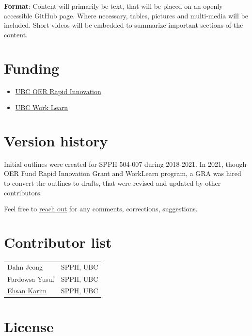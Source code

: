 \documentclass[
]{book}
\providecommand{\tightlist}{%
  \setlength{\itemsep}{0pt}\setlength{\parskip}{0pt}}
\begin{document}
\textbf{Format}: Content will primarily be text, that will be placed on an openly accessible GitHub page. Where necessary, tables, pictures and multi-media will be included. Short videos will be embedded to summarize important sections of the content.

\hypertarget{funding}{%
\section*{Funding}\label{funding}}

\begin{itemize}
\tightlist
\item
  \href{https://oerfund.open.ubc.ca/oer-rapid-innovation-grants/}{UBC OER Rapid Innovation}
\item
  \href{https://facultystaff.students.ubc.ca/student-engagement/centre-student-involvement-careers/work-learn}{UBC Work Learn}
\end{itemize}

\hypertarget{version-history}{%
\section*{Version history}\label{version-history}}

Initial outlines were created for SPPH 504-007 during 2018-2021. In 2021, though OER Fund Rapid Innovation Grant and WorkLearn program, a GRA was hired to convert the outlines to drafts, that were revised and updated by other contributors.

Feel free to \href{https://ehsank.com/}{reach out} for any comments, corrections, suggestions.

\hypertarget{contributor-list}{%
\section*{Contributor list}\label{contributor-list}}

\begin{longtable}[]{@{}ll@{}}
\toprule
\endhead
Dahn Jeong & SPPH, UBC \\
Fardowsa Yusuf & SPPH, UBC \\
\href{https://ehsank.com/}{Ehsan Karim} & SPPH, UBC \\
\bottomrule
\end{longtable}

\hypertarget{license}{%
\section*{License}\label{license}}
\end{document}
